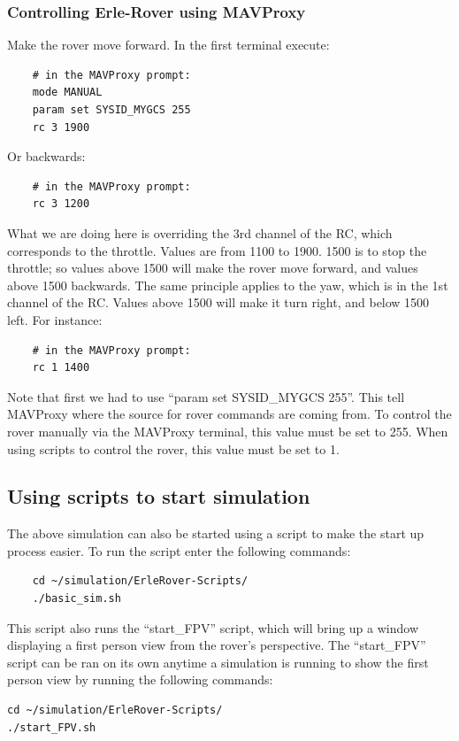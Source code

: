 \documentclass{report}
\begin{document}
\subsubsection{Controlling Erle-Rover using MAVProxy}
Make the rover move forward. In the first terminal execute:
\begin{lstlisting}
	# in the MAVProxy prompt:
	mode MANUAL
	param set SYSID_MYGCS 255
	rc 3 1900
\end{lstlisting}
Or backwards:
\begin{lstlisting}
	# in the MAVProxy prompt:
	rc 3 1200
\end{lstlisting}
What we are doing here is overriding the 3rd channel of the RC, which corresponds to the throttle. Values are from 1100 to 1900. 1500 is to stop the throttle; so values above 1500 will make the rover move forward, and values above 1500 backwards. The same principle applies to the yaw, which is in the 1st channel of the RC. Values above 1500 will make it turn right, and below 1500 left. For instance:
\begin{lstlisting}
	# in the MAVProxy prompt:
	rc 1 1400
\end{lstlisting}

Note that first we had to use ``param set SYSID\_MYGCS 255''. This tell MAVProxy where the source for rover commands are coming from. To control the rover manually via the MAVProxy terminal, this value must be set to 255. When using scripts to control the rover, this value must be set to 1.

\subsection{Using scripts to start simulation}
The above simulation can also be started using a script to make the start up process easier. To run the script enter the following commands:

\begin{lstlisting}
	cd ~/simulation/ErleRover-Scripts/
	./basic_sim.sh 
\end{lstlisting}
\label{startFPV}
This script also runs the ``start\_FPV'' script, which will bring up a window displaying a first person view from the rover's perspective. The ``start\_FPV'' script can be ran on its own anytime a simulation is running to show the first person view by running the following commands:
\begin{lstlisting}
cd ~/simulation/ErleRover-Scripts/
./start_FPV.sh 
\end{lstlisting}
\end{document}
